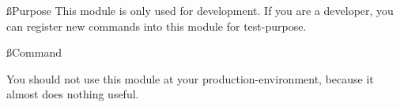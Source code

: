 
\ss{Purpose}
This module is only used for development.
If you are a developer, you can register new commands into this module for test-purpose.

\ss{Command}

\begin{warn}{}
    You should not use this module at your production-environment, because it almost does nothing useful.
\end{warn}

